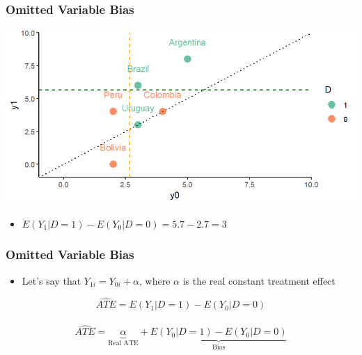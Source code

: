 \documentclass[xcolor=x11names,compress]{beamer}\usepackage[]{graphicx}\usepackage[]{color}
\makeatletter
\def\maxwidth{ %
  \ifdim\Gin@nat@width>\linewidth
    \linewidth
  \else
    \Gin@nat@width
  \fi
}
\newenvironment{knitrout}{}{} %
\renewcommand{\(}{\begin{columns}}
\renewcommand{\)}{\end{columns}}
\newcommand{\<}[1]{\begin{column}{#1}}
\renewcommand{\>}{\end{column}}
\makeatother
\begin{document}
\begin{frame}
\frametitle{Omitted Variable Bias}
\begin{knitrout}
\color{fgcolor}
\includegraphics[width=\maxwidth]{figure/Chart_1b-1} 

\end{knitrout}
\begin{itemize}
\item $E(Y_1|D=1) - E(Y_0|D=0) = 5.7 - 2.7 = 3$
\end{itemize}
\end{frame}

\begin{frame}
\frametitle{Omitted Variable Bias}
\begin{itemize}
\item Let's say that $Y_{1i} = Y_{0i} + \alpha$, where $\alpha$ is the real constant treatment effect
\end{itemize}
$$ \hat{ATE} = E(Y_1|D=1) - E(Y_0|D=0)$$ \\ \pause
$$ \hat{ATE} = \underbrace{\alpha}_\text{Real ATE} + \underbrace{E(Y_0|D=1) - E(Y_0|D=0)}_\text{Bias}$$ \\
\end{frame}
\end{document}
